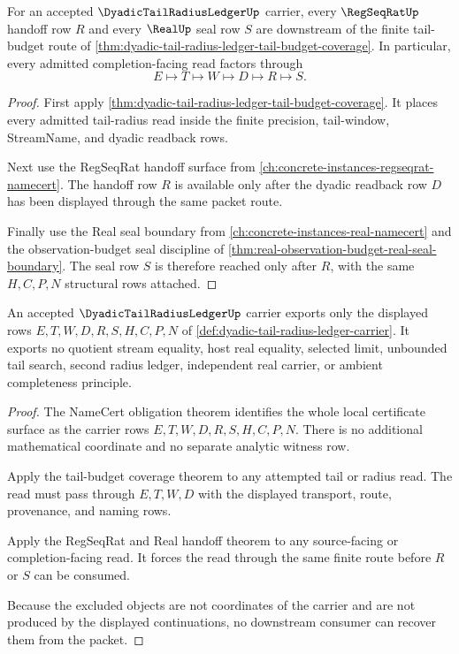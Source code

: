 \begin{theorem}
\label{thm:dyadic-tail-radius-ledger-regseq-real-handoff}
For an accepted $\DyadicTailRadiusLedgerUp$ carrier, every $\RegSeqRatUp$ handoff row $R$ and every $\RealUp$ seal row $S$ are downstream of the finite tail-budget route of \autoref{thm:dyadic-tail-radius-ledger-tail-budget-coverage}. In particular, every admitted completion-facing read factors through
$$
E \longmapsto T \longmapsto W \longmapsto D \longmapsto R \longmapsto S.
$$
\end{theorem}
\begin{proof}
First apply \autoref{thm:dyadic-tail-radius-ledger-tail-budget-coverage}. It places every admitted tail-radius read inside the finite precision, tail-window, StreamName, and dyadic readback rows.

Next use the RegSeqRat handoff surface from \autoref{ch:concrete-instances-regseqrat-namecert}. The handoff row $R$ is available only after the dyadic readback row $D$ has been displayed through the same packet route.

Finally use the Real seal boundary from \autoref{ch:concrete-instances-real-namecert} and the observation-budget seal discipline of \autoref{thm:real-observation-budget-real-seal-boundary}. The seal row $S$ is therefore reached only after $R$, with the same $H,C,P,N$ structural rows attached.
\end{proof}

\begin{theorem}
\label{thm:dyadic-tail-radius-ledger-nonescape}
An accepted $\DyadicTailRadiusLedgerUp$ carrier exports only the displayed rows $E,T,W,D,R,S,H,C,P,N$ of \autoref{def:dyadic-tail-radius-ledger-carrier}. It exports no quotient stream equality, host real equality, selected limit, unbounded tail search, second radius ledger, independent real carrier, or ambient completeness principle.
\end{theorem}
\begin{proof}
The NameCert obligation theorem identifies the whole local certificate surface as the carrier rows $E,T,W,D,R,S,H,C,P,N$. There is no additional mathematical coordinate and no separate analytic witness row.

Apply the tail-budget coverage theorem to any attempted tail or radius read. The read must pass through $E,T,W,D$ with the displayed transport, route, provenance, and naming rows.

Apply the RegSeqRat and Real handoff theorem to any source-facing or completion-facing read. It forces the read through the same finite route before $R$ or $S$ can be consumed.

Because the excluded objects are not coordinates of the carrier and are not produced by the displayed continuations, no downstream consumer can recover them from the packet.
\end{proof}

